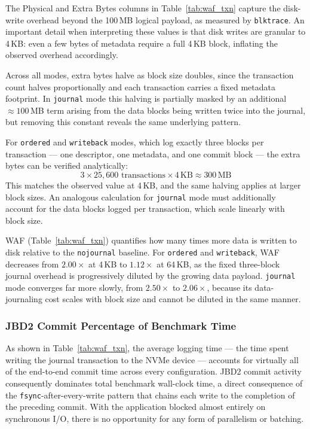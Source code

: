 \documentclass[12pt,a4paper]{article}
\begin{document}
The Physical and Extra Bytes columns in Table~\ref{tab:waf_txn} capture the disk-write
overhead beyond the 100\,MB logical payload, as measured by \texttt{blktrace}. An
important detail when interpreting these values is that disk writes are granular to
4\,KB: even a few bytes of metadata require a full 4\,KB block, inflating the observed
overhead accordingly.

Across all modes, extra bytes halve as block size doubles, since the transaction count
halves proportionally and each transaction carries a fixed metadata footprint. In
\texttt{journal} mode this halving is partially masked by an additional
${\approx}100$\,MB term arising from the data blocks being written twice into the
journal, but removing this constant reveals the same underlying pattern.

For \texttt{ordered} and \texttt{writeback} modes, which log exactly three blocks per
transaction --- one descriptor, one metadata, and one commit block --- the extra bytes
can be verified analytically:
\begin{equation}
    3 \times 25{,}600 \text{ transactions} \times 4\,\text{KB} \approx 300\,\text{MB}
\end{equation}
This matches the observed value at 4\,KB, and the same halving applies at larger block
sizes. An analogous calculation for \texttt{journal} mode must additionally account for
the data blocks logged per transaction, which scale linearly with block size.

WAF (Table~\ref{tab:waf_txn}) quantifies how many times more data is written to disk
relative to the \texttt{nojournal} baseline. For \texttt{ordered} and
\texttt{writeback}, WAF decreases from $2.00\times$ at 4\,KB to $1.12\times$ at
64\,KB, as the fixed three-block journal overhead is progressively diluted by the
growing data payload. \texttt{journal} mode converges far more slowly, from
$2.50\times$ to $2.06\times$, because its data-journaling cost scales with block size
and cannot be diluted in the same manner.

\subsubsection{JBD2 Commit Percentage of Benchmark Time}
As shown in Table~\ref{tab:waf_txn}, the average logging time --- the time spent
writing the journal transaction to the NVMe device --- accounts for virtually all of
the end-to-end commit time across every configuration. JBD2 commit activity
consequently dominates total benchmark wall-clock time, a direct consequence of the
\texttt{fsync}-after-every-write pattern that chains each write to the completion of
the preceding commit. With the application blocked almost entirely on synchronous I/O,
there is no opportunity for any form of parallelism or batching.
\end{document}
